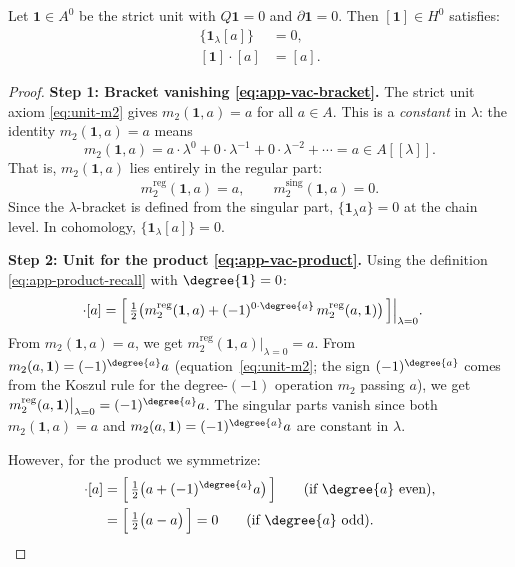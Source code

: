 \begin{proposition}[Vacuum]
\label{prop:app-vacuum}
Let $\mathbf{1}\in A^0$ be the strict unit with $Q\mathbf{1} = 0$ and $\partial\mathbf{1} = 0$. Then $[\mathbf{1}]\in H^0$ satisfies:
\begin{align}
\label{eq:app-vac-bracket}
\{\mathbf{1}{}_\lambda [a]\} &= 0,\\[3pt]
\label{eq:app-vac-product}
[\mathbf{1}]\cdot [a] &= [a].
\end{align}
\end{proposition}

\begin{proof}
\textbf{Step 1: Bracket vanishing \eqref{eq:app-vac-bracket}.}
The strict unit axiom \eqref{eq:unit-m2} gives $m_2(\mathbf{1},a) = a$ for all $a\in A$. This is a \emph{constant} in $\lambda$: the identity $m_2(\mathbf{1},a) = a$ means
\[
m_2(\mathbf{1},a) = a \cdot \lambda^0 + 0\cdot \lambda^{-1} + 0 \cdot \lambda^{-2} + \cdots = a \in A[[\lambda]].
\]
That is, $m_2(\mathbf{1},a)$ lies entirely in the regular part:
\[
m_2^{\mathrm{reg}}(\mathbf{1},a) = a, \qquad m_2^{\mathrm{sing}}(\mathbf{1},a) = 0.
\]
Since the $\lambda$-bracket is defined from the singular part, $\{\mathbf{1}{}_\lambda a\} = 0$ at the chain level. In cohomology, $\{\mathbf{1}{}_\lambda [a]\} = 0$.

\textbf{Step 2: Unit for the product \eqref{eq:app-vac-product}.}
Using the definition \eqref{eq:app-product-recall} with $\degree{\mathbf{1}} = 0$:
\begin{align*}
[\mathbf{1}]\cdot [a]
&= \Bigl[\,\tfrac{1}{2}\bigl(m_2^{\mathrm{reg}}(\mathbf{1},a) + (-1)^{0\cdot\degree{a}}\,m_2^{\mathrm{reg}}(a,\mathbf{1})\bigr)\,\Bigr]\Big|_{\lambda=0}.
\end{align*}
From $m_2(\mathbf{1},a) = a$, we get $m_2^{\mathrm{reg}}(\mathbf{1},a)\big|_{\lambda=0} = a$. From $m_2(a,\mathbf{1}) = (-1)^{\degree{a}}a$ (equation~\eqref{eq:unit-m2}; the sign $(-1)^{\degree{a}}$ comes from the Koszul rule for the degree-$(-1)$ operation $m_2$ passing $a$), we get $m_2^{\mathrm{reg}}(a,\mathbf{1})\big|_{\lambda=0} = (-1)^{\degree{a}}a$. The singular parts vanish since both $m_2(\mathbf{1},a) = a$ and $m_2(a,\mathbf{1}) = (-1)^{\degree{a}}a$ are constant in $\lambda$.

However, for the product we symmetrize:
\begin{align*}
[\mathbf{1}]\cdot [a]
&= \Bigl[\,\tfrac{1}{2}\bigl(a + (-1)^{\degree{a}}a\bigr)\,\Bigr] \qquad\text{(if $\degree{a}$ even)},\\
&= \Bigl[\,\tfrac{1}{2}\bigl(a - a\bigr)\,\Bigr] = 0 \qquad\text{(if $\degree{a}$ odd)}.
\end{align*}


\end{proof}
